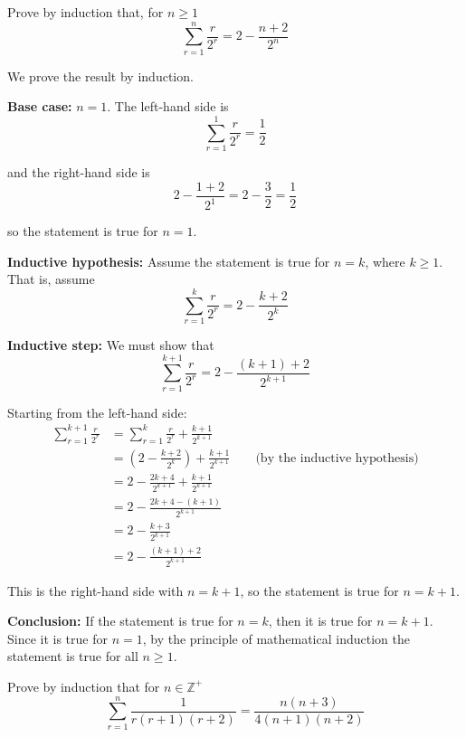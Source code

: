 \documentclass[leqno]{article}
\begin{document}
\begin{enumerate}[
  label=\textbf{\arabic*.},
  leftmargin=*,
  topsep=0pt,
  partopsep=0pt,
  parsep=0pt
]
\newpage

\questionitem

Prove by induction that, for $n \ge 1$
\[
\sum_{r=1}^{n} \frac{r}{2^r} = 2 - \frac{n+2}{2^n}
\]

\vspace*{10pt}

\begin{djsSolution}
We prove the result by induction.

\textbf{Base case:} $n=1$. The left-hand side is
\[
\sum_{r=1}^{1}\frac{r}{2^r}=\frac{1}{2}
\]

and the right-hand side is
\[
2-\frac{1+2}{2^1}=2-\frac{3}{2}=\frac{1}{2}
\]

so the statement is true for $n=1$.

\textbf{Inductive hypothesis:} Assume the statement is true for $n=k$, where $k\ge 1$. That is, assume
\[
\sum_{r=1}^{k}\frac{r}{2^r}=2-\frac{k+2}{2^k}
\]

\textbf{Inductive step:} We must show that
\[
\sum_{r=1}^{k+1}\frac{r}{2^r}=2-\frac{(k+1)+2}{2^{k+1}}
\]

Starting from the left-hand side:
\begin{align*}
\sum_{r=1}^{k+1}\frac{r}{2^r}
&=\sum_{r=1}^{k}\frac{r}{2^r}+\frac{k+1}{2^{k+1}}\\
&= \left(2-\frac{k+2}{2^k}\right)+\frac{k+1}{2^{k+1}}
\qquad \text{(by the inductive hypothesis)}\\
&=2-\frac{2k+4}{2^{k+1}}+\frac{k+1}{2^{k+1}}\\
&=2-\frac{2k+4-(k+1)}{2^{k+1}}\\
&=2-\frac{k+3}{2^{k+1}}\\
&=2-\frac{(k+1)+2}{2^{k+1}}
\end{align*}

This is the right-hand side with $n=k+1$, so the statement is true for $n=k+1$.

\textbf{Conclusion:} If the statement is true for $n=k$, then it is true for $n=k+1$. Since it is true for $n=1$, by the principle of mathematical induction the statement is true for all $n \ge 1$.
\end{djsSolution}


\newpage

\questionitem

Prove by induction that for $n \in \mathbb{Z}^{+}$
\[
\sum_{r=1}^{n} \frac{1}{r(r+1)(r+2)} = \frac{n(n+3)}{4(n+1)(n+2)}
\]


\end{enumerate}
\end{document}

